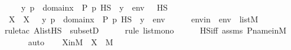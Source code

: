 \begin{isabellebody}
\ \ \ {\isachardoublequoteopen}{\isacharbraceleft}{\kern0pt}\ {\isacharless}{\kern0pt}y{\isacharcomma}{\kern0pt}\ p{\isachargreater}{\kern0pt}\ {\isasymin}\ domain{\isacharparenleft}{\kern0pt}x{\isacharparenright}{\kern0pt}\ {\isasymtimes}\ P{\isachardot}{\kern0pt}\ p\ {\isasymtturnstile}HS\ {\isasymphi}\ {\isacharbrackleft}{\kern0pt}y{\isacharbrackright}{\kern0pt}\ {\isacharat}{\kern0pt}\ env\ {\isacharbraceright}{\kern0pt}\ {\isasymin}\ HS{\isachardoublequoteclose}\isanewline
%
\isadelimproof
%
\endisadelimproof
%
\isatagproof
{}\isamarkupfalse%
\ {\isacharminus}{\kern0pt}\ \isanewline
\ \ \isamarkupfalse%
\ X\ \ {\isachardoublequoteopen}X\ {\isasymequiv}\ {\isacharbraceleft}{\kern0pt}\ {\isacharless}{\kern0pt}y{\isacharcomma}{\kern0pt}\ p{\isachargreater}{\kern0pt}\ {\isasymin}\ domain{\isacharparenleft}{\kern0pt}x{\isacharparenright}{\kern0pt}\ {\isasymtimes}\ P{\isachardot}{\kern0pt}\ p\ {\isasymtturnstile}HS\ {\isasymphi}\ {\isacharbrackleft}{\kern0pt}y{\isacharbrackright}{\kern0pt}\ {\isacharat}{\kern0pt}\ env\ {\isacharbraceright}{\kern0pt}{\isachardoublequoteclose}\ \isanewline
\isanewline
\ \ \isamarkupfalse%
\ envin\ {\isacharcolon}{\kern0pt}\ {\isachardoublequoteopen}env\ {\isasymin}\ list{\isacharparenleft}{\kern0pt}M{\isacharparenright}{\kern0pt}{\isachardoublequoteclose}\ \isanewline
\ \ \ \ \isamarkupfalse%
{\isacharparenleft}{\kern0pt}rule{\isacharunderscore}{\kern0pt}tac\ A{\isacharequal}{\kern0pt}{\isachardoublequoteopen}list{\isacharparenleft}{\kern0pt}HS{\isacharparenright}{\kern0pt}{\isachardoublequoteclose}\ \ subsetD{\isacharparenright}{\kern0pt}\isanewline
\ \ \ \ \ \isamarkupfalse%
{\isacharparenleft}{\kern0pt}rule\ list{\isacharunderscore}{\kern0pt}mono{\isacharparenright}{\kern0pt}\isanewline
\ \ \ \ \isamarkupfalse%
\ HS{\isacharunderscore}{\kern0pt}iff\ assms\ P{\isacharunderscore}{\kern0pt}name{\isacharunderscore}{\kern0pt}in{\isacharunderscore}{\kern0pt}M\ \isanewline
\ \ \ \ \isamarkupfalse%
\ auto\isanewline
\isanewline
\ \ \isamarkupfalse%
\ XinM\ {\isacharcolon}{\kern0pt}\ {\isachardoublequoteopen}X\ {\isasymin}\ M{\isachardoublequoteclose}\ \isanewline
\ \ \isamarkupfalse%
\ {\isacharminus}{\kern0pt}\ \isanewline
\ \ \ \ \isamarkupfalse%

\end{isabellebody}
